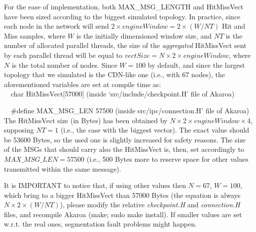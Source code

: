 \documentclass[10pt]{article}
\begin{document}
For the ease of implementation, both MAX\_MSG\_LENGTH and HitMissVect have been sized according to the biggest simulated topology. In practice, since each node in the network will send $2 \times engineWindow = 2 \times (W/NT)$ Hit and Miss samples, where $W$ is the initially dimensioned window size, and $NT$ is the number of allocated parallel threads, the size of the \emph{aggregated} HitMissVect sent by each parallel thread will be equal to  $vectSize = N \times 2 \times engineWindow$, where $N$ is the total number of nodes. 
Since $W=100$ by default, and since the largest topology that we simulated is the CDN-like one (i.e., with 67 nodes), the aforementioned variables are set at compile time as: \\

\ \ char HitMissVect[57000] (inside `src/include/checkpoint.H' file of Akaroa)

\ \ \#define MAX\_MSG\_LEN 57500 (inside src/ipc/connection.H' file of Akaroa) \\

The HitMissVect size (in Bytes) has been obtained by $N \times 2 \times engineWindow \times 4$, supposing $NT=1$ (i.e., the case with the biggest vector). 
The exact value should be 53600 Bytes, so the used one is slightly increased for safety reasons.
The size of the MSGs that should carry also the HitMissVect is, then, set accordingly to $MAX\_MSG\_LEN=57500$ (i.e., 500 Bytes more to reserve space for other values transmitted within the same message).

It is IMPORTANT to notice that, if using other values then $N=67$, $W=100$, which bring to a bigger HitMissVect than 57000 Bytes (the equation is always $N \times 2 \times (W/NT)$), please modify the relative \emph{checkpoint.H} and \emph{connection.H} files, and recompile Akaroa (make; sudo make install). 
If smaller values are set w.r.t. the real ones, segmentation fault problems might happen.  





\end{document}
